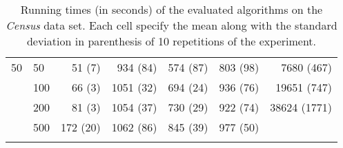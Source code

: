 \begin{longtable}{llrrrrr}
 \midrule
50 & 50  &    51 (7) &       934 (84) &  574 (87) &             803 (98) &    7680 (467) \\
   & 100 &    66 (3) &      1051 (32) &  694 (24) &             936 (76) &   19651 (747) \\
   & 200 &    81 (3) &      1054 (37) &  730 (29) &             922 (74) &  38624 (1771) \\
   & 500 &  172 (20) &      1062 (86) &  845 (39) &             977 (50) &            \\
\bottomrule
\caption{Running times (in seconds) of the evaluated algorithms on the \textit{Census} data set. Each cell specify the mean along with the standard deviation in parenthesis of 10 repetitions of the experiment.}
\label{tab:running-time-mean-census}
\end{longtable}

